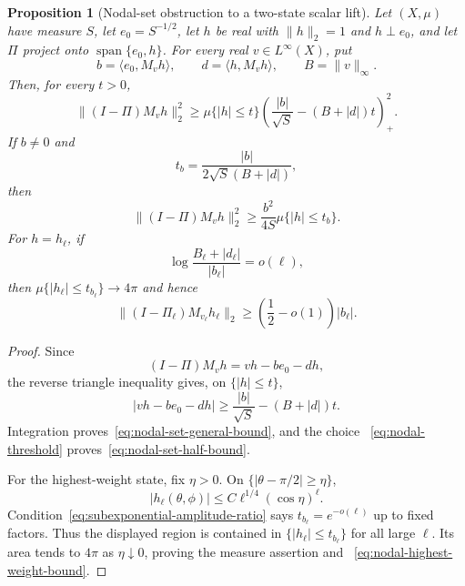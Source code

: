\documentclass[11pt]{article}
\newtheorem{proposition}[theorem]{Proposition}
\theoremstyle{definition}
\theoremstyle{remark}
\begin{document}
\begin{proposition}[Nodal-set obstruction to a two-state scalar lift]
\label{prop:nodal-set-lift-obstruction}
Let $(X,\mu)$ have measure $S$, let $e_0=S^{-1/2}$, let $h$ be real with
$\|h\|_2=1$ and $h\perp e_0$, and let $\Pi$ project onto
$\operatorname{span}\{e_0,h\}$.  For every real $v\in L^\infty(X)$, put
\begin{equation}
 b=\langle e_0,M_vh\rangle,
 \qquad d=\langle h,M_vh\rangle,
 \qquad B=\|v\|_\infty.
\end{equation}
Then, for every $t>0$,
\begin{equation}
 \|(I-\Pi)M_vh\|_2^2
 \geq \mu\{|h|\leq t\}
 \left(\frac{|b|}{\sqrt S}-(B+|d|)t\right)_+^2.
 \label{eq:nodal-set-general-bound}
\end{equation}
If $b\neq0$ and
\begin{equation}
 t_b=\frac{|b|}{2\sqrt S(B+|d|)},
 \label{eq:nodal-threshold}
\end{equation}
then
\begin{equation}
 \|(I-\Pi)M_vh\|_2^2
 \geq\frac{b^2}{4S}\mu\{|h|\leq t_b\}.
 \label{eq:nodal-set-half-bound}
\end{equation}
For $h=h_\ell$, if
\begin{equation}
 \log\frac{B_\ell+|d_\ell|}{|b_\ell|}=o(\ell),
 \label{eq:subexponential-amplitude-ratio}
\end{equation}
then $\mu\{|h_\ell|\leq t_{b_\ell}\}\to4\pi$ and hence
\begin{equation}
 \|(I-\Pi_\ell)M_{v_\ell}h_\ell\|_2
 \geq\left(\frac12-o(1)\right)|b_\ell|.
 \label{eq:nodal-highest-weight-bound}
\end{equation}
\end{proposition}

\begin{proof}
Since
\begin{equation}
 (I-\Pi)M_vh=vh-be_0-dh,
\end{equation}
the reverse triangle inequality gives, on $\{|h|\leq t\}$,
\begin{equation}
 |vh-be_0-dh|
 \geq\frac{|b|}{\sqrt S}-(B+|d|)t.
\end{equation}
Integration proves~\eqref{eq:nodal-set-general-bound}, and the choice
~\eqref{eq:nodal-threshold} proves~\eqref{eq:nodal-set-half-bound}.

For the highest-weight state, fix $\eta>0$.  On
$\{|\theta-\pi/2|\geq\eta\}$,
\begin{equation}
 |h_\ell(\theta,\phi)|
 \leq C\ell^{1/4}(\cos\eta)^\ell.
\end{equation}
Condition~\eqref{eq:subexponential-amplitude-ratio} says
$t_{b_\ell}=e^{-o(\ell)}$ up to fixed factors.  Thus the displayed region is
contained in $\{|h_\ell|\leq t_{b_\ell}\}$ for all large $\ell$.  Its area
tends to $4\pi$ as $\eta\downarrow0$, proving the measure assertion and
~\eqref{eq:nodal-highest-weight-bound}.
\end{proof}
\end{document}

